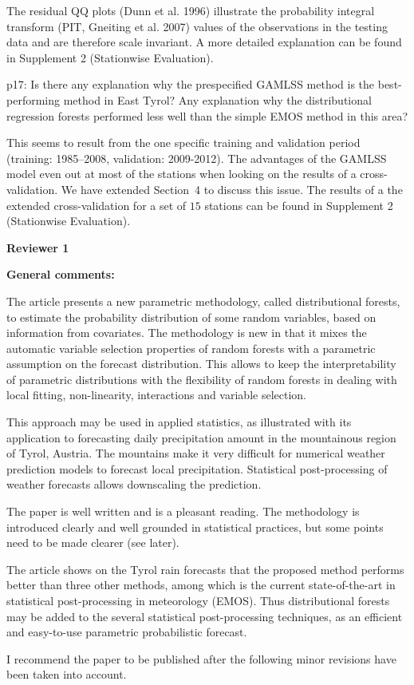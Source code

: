 \documentclass[american,foldmarks=false,noconfig]{uibklttr}
\newenvironment{review}{\fontshape{\itdefault}\fontseries{\bfdefault} \selectfont \smallskip}{\par}
\begin{document}
The residual QQ plots (Dunn et al. 1996) illustrate the probability 
integral transform (PIT, Gneiting et al. 2007) values of the observations 
in the testing data and are therefore scale invariant. A more detailed 
explanation can be found in Supplement 2 (Stationwise Evaluation).

\begin{review}
p17: Is there any explanation why the prespecified GAMLSS 
method is the best-performing method in East Tyrol? Any 
explanation why the distributional regression forests 
performed less well than the simple EMOS method in this area?
\end{review}

This seems to result from the one specific training and validation period 
(training: 1985--2008, validation: 2009-2012).
The advantages of the GAMLSS model even out at most of the stations when looking 
on the results of a cross-validation. We have extended Section~4 to discuss this 
issue. The results of a the extended cross-validation for a set of $15$ stations 
can be found in Supplement 2 (Stationwise Evaluation).

\newpage


\textbf{\LARGE Reviewer 1}

\bigskip

\textbf{General comments:}

\begin{review}
The article presents a new parametric methodology, called 
distributional forests, to estimate the probability 
distribution of some random variables, based on information 
from covariates. The methodology is new in that it mixes the
automatic variable selection properties of random forests 
with a parametric assumption on the forecast distribution. 
This allows to keep the interpretability of parametric 
distributions with the flexibility of random forests in 
dealing with local fitting, non-linearity, interactions 
and variable selection.

This approach may be used in applied statistics, as 
illustrated with its application to forecasting daily 
precipitation amount in the mountainous region of Tyrol, 
Austria. The mountains make it very difficult for numerical 
weather prediction models to forecast local precipitation. 
Statistical post-processing of weather forecasts allows 
downscaling the prediction.

The paper is well written and is a pleasant reading. 
The methodology is introduced clearly and well grounded 
in statistical practices, but some points need to be 
made clearer (see later).

The article shows on the Tyrol rain forecasts that the 
proposed method performs better than three other methods, 
among which is the current state-of-the-art in statistical 
post-processing in meteorology (EMOS). Thus distributional
forests may be added to the several statistical post-processing 
techniques, as an efficient and easy-to-use parametric 
probabilistic forecast.

I recommend the paper to be published after the following 
minor revisions have been taken into account.
\end{review}
\end{document}
